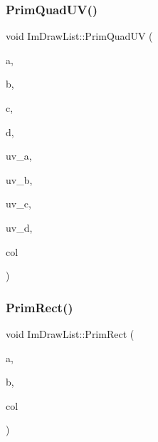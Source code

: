 \subsubsection{\texorpdfstring{Prim\+Quad\+U\+V()}{PrimQuadUV()}}
{\footnotesize\ttfamily void Im\+Draw\+List\+::\+Prim\+Quad\+UV (\begin{DoxyParamCaption}\item[{const \hyperlink{struct_im_vec2}{Im\+Vec2} \&}]{a,  }\item[{const \hyperlink{struct_im_vec2}{Im\+Vec2} \&}]{b,  }\item[{const \hyperlink{struct_im_vec2}{Im\+Vec2} \&}]{c,  }\item[{const \hyperlink{struct_im_vec2}{Im\+Vec2} \&}]{d,  }\item[{const \hyperlink{struct_im_vec2}{Im\+Vec2} \&}]{uv\+\_\+a,  }\item[{const \hyperlink{struct_im_vec2}{Im\+Vec2} \&}]{uv\+\_\+b,  }\item[{const \hyperlink{struct_im_vec2}{Im\+Vec2} \&}]{uv\+\_\+c,  }\item[{const \hyperlink{struct_im_vec2}{Im\+Vec2} \&}]{uv\+\_\+d,  }\item[{Im\+U32}]{col }\end{DoxyParamCaption})}

\hypertarget{struct_im_draw_list_ae2be093563f1d20b8190b7c423113925}{}\label{struct_im_draw_list_ae2be093563f1d20b8190b7c423113925} 
\subsubsection{\texorpdfstring{Prim\+Rect()}{PrimRect()}}
{\footnotesize\ttfamily void Im\+Draw\+List\+::\+Prim\+Rect (\begin{DoxyParamCaption}\item[{const \hyperlink{struct_im_vec2}{Im\+Vec2} \&}]{a,  }\item[{const \hyperlink{struct_im_vec2}{Im\+Vec2} \&}]{b,  }\item[{Im\+U32}]{col }\end{DoxyParamCaption})}

\hypertarget{struct_im_draw_list_a77d48ed5b33ccdd908824c0a3bebfff8}{}\label{struct_im_draw_list_a77d48ed5b33ccdd908824c0a3bebfff8} 
